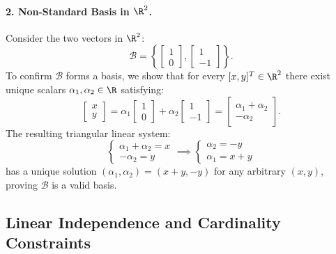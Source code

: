 \paragraph{2. Non-Standard Basis in $\R^2$.}
Consider the two vectors in $\R^2$:
\begin{equation}
    \mathcal{B} = \left\{ \begin{bmatrix} 1 \\ 0 \end{bmatrix}, \begin{bmatrix} 1 \\ -1 \end{bmatrix} \right\}.
\end{equation}
To confirm $\mathcal{B}$ forms a basis, we show that for every $[x, y]^T \in \R^2$ there exist unique scalars $\alpha_1, \alpha_2 \in \R$ satisfying:
\begin{equation}
    \begin{bmatrix} x \\ y \end{bmatrix} = \alpha_1 \begin{bmatrix} 1 \\ 0 \end{bmatrix} + \alpha_2 \begin{bmatrix} 1 \\ -1 \end{bmatrix} = \begin{bmatrix} \alpha_1 + \alpha_2 \\ -\alpha_2 \end{bmatrix}.
\end{equation}
The resulting triangular linear system:
\begin{equation}
    \begin{cases} \alpha_1 + \alpha_2 = x \\ -\alpha_2 = y \end{cases} \implies \begin{cases} \alpha_2 = -y \\ \alpha_1 = x + y \end{cases}
\end{equation}
has a unique solution $(\alpha_1, \alpha_2) = (x+y, -y)$ for any arbitrary $(x, y)$, proving $\mathcal{B}$ is a valid basis.

\subsection{Linear Independence and Cardinality Constraints}

